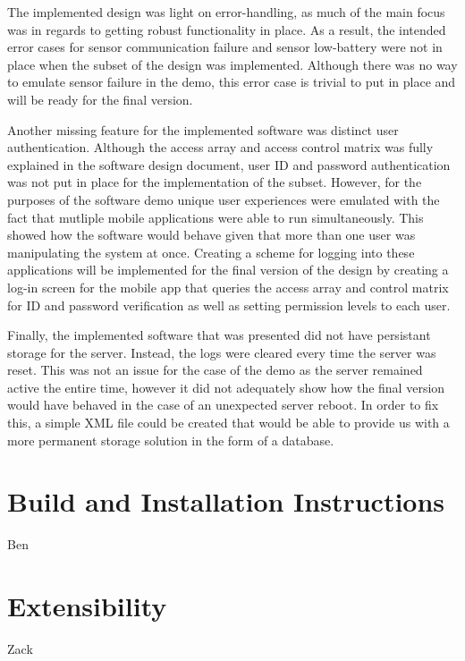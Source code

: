 \documentclass{article}
\begin{document}
The implemented design was light on error-handling, as much of the main focus
was in regards to getting robust functionality in place. As a result, the intended
error cases for sensor communication failure and sensor low-battery were not
in place when the subset of the design was implemented. Although there was no
way to emulate sensor failure in the demo, this error case is trivial to put in
place and will be ready for the final version.

Another missing feature for the implemented software was distinct user
authentication. Although the access array and access control matrix was fully
explained in the software design document, user ID and password authentication
was not put in place for the implementation of the subset. However, for the
purposes of the software demo unique user experiences were emulated with the
fact that mutliple mobile applications were able to run simultaneously. This
showed how the software would behave given that more than one user was
manipulating the system at once. Creating a scheme for logging into these 
applications will be implemented for the final version of the design by 
creating a log-in screen for the mobile app that queries the access array
and control matrix for ID and password verification as well as setting permission
levels to each user.

Finally, the implemented software that was presented did not have persistant
storage for the server. Instead, the logs were cleared every time the server
was reset. This was not an issue for the case of the demo as the server remained
active the entire time, however it did not adequately show how the final version
would have behaved in the case of an unexpected server reboot. In order to fix
this, a simple XML file could be created that would be able to provide us with a
more permanent storage solution in the form of a database.

\section{Build and Installation Instructions} Ben

\section{Extensibility} Zack
\end{document}
